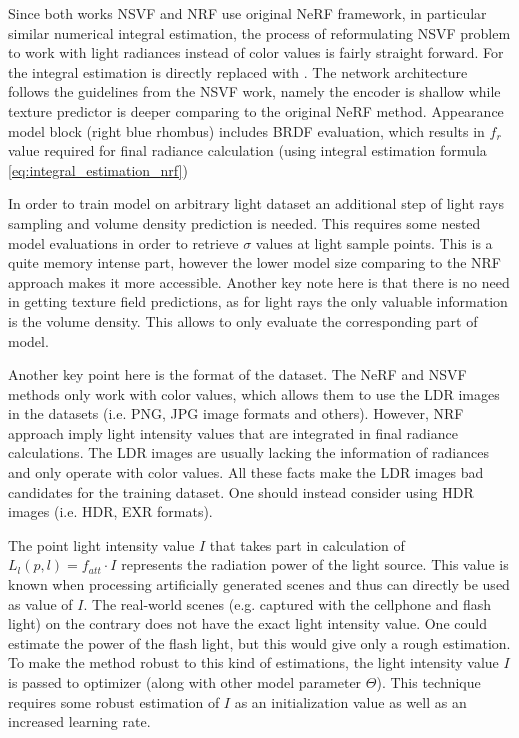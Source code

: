 Since both works NSVF and NRF use original NeRF framework,
in particular similar numerical integral estimation,
the process of reformulating NSVF problem to work with light radiances instead of color values is fairly straight forward.
For the integral estimation  is directly replaced with .
The network architecture follows the guidelines from the NSVF work,
namely the encoder is shallow while texture predictor is deeper
comparing to the original NeRF method.
Appearance model block (right blue rhombus) includes BRDF evaluation,
which results in $f_r$ value required for final radiance calculation (using integral estimation formula \cref{eq:integral_estimation_nrf})

In order to train model on arbitrary light dataset
an additional step of light rays sampling and volume density prediction is needed.
This requires some nested model evaluations in order to retrieve $\sigma$ values at light sample points.
This is a quite memory intense part, however the lower model size comparing to the NRF approach makes it more accessible.
Another key note here is that there is no need in getting texture field predictions,
as for light rays the only valuable information is the volume density.
This allows to only evaluate the corresponding part of model.

Another key point here is the format of the dataset.
The NeRF and NSVF methods only work with color values,
which allows them to use the LDR images in the datasets
(i.e. PNG, JPG image formats and others).
However, NRF approach imply light intensity values that are integrated in final radiance calculations.
The LDR images are usually lacking the information of radiances
and only operate with color values.
All these facts make the LDR images bad candidates for the training dataset.
One should instead consider using HDR images (i.e. HDR, EXR formats).

The point light intensity value $I$ that takes part in calculation of $L_l(p, l) = f_{att} \cdot I$
represents the radiation power of the light source.
This value is known when processing artificially generated scenes
and thus can directly be used as value of $I$.
The real-world scenes (e.g. captured with the cellphone and flash light)
on the contrary does not have the exact light intensity value.
One could estimate the power of the flash light, but this would give only a rough estimation.
To make the method robust to this kind of estimations,
the light intensity value $I$ is passed to optimizer (along with other model parameter $\Theta$).
This technique requires some robust estimation of $I$ as an initialization value as well as an increased learning rate.




